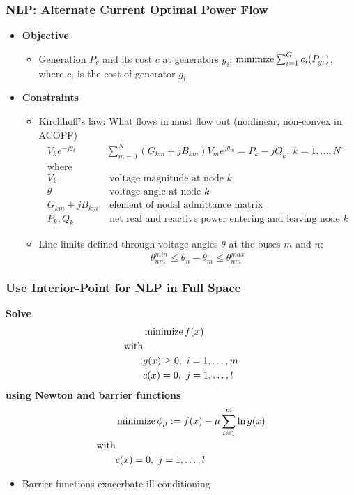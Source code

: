 \begin{frame}[fragile]
  \frametitle{NLP: Alternate Current Optimal Power Flow}
  \begin{itemize}
    \item {\bf Objective}
    \begin{itemize}
      \item Generation $P_g$ and its cost $c$ at generators $g_i$:
      $ \minimize \sum^G_{i=1} c_i(P_{g_i})$, where $c_i$ is the cost of generator $g_i$
    \end{itemize}
    \item {\bf Constraints}
    \begin{itemize}
      \item Kirchhoff's law: What flows in must flow out (nonlinear, non-convex in ACOPF)
      \begin{align*}
        V_k e^{-j\theta_k} & \sum^{N}_{m=0} (G_{km} + jB_{km})V_m e^{j\theta_m} = P_k - j Q_k,\ k = 1, \dots, N \\
        \text{where}\\
        V_k &\text{ voltage magnitude at node } k\\
        \theta &\text{ voltage angle at node } k\\
        G_{km} + jB_{km}& \text{ element of nodal admittance matrix}\\
        P_k , Q_k &\text{ net real and reactive power entering and leaving node } k
      \end{align*}
      \item Line limits defined through voltage angles $\theta$ at the buses $m$ and $n$:
      $$ \theta^{min}_{nm} \leq \theta_n - \theta_m \leq \theta^{max}_{nm}$$
    \end{itemize}
  \end{itemize}
\end{frame}

\begin{frame}[fragile]
  \frametitle{Use Interior-Point for NLP in Full Space}
  {\bf Solve}
  \begin{align*}
  &\minimize f(x)\\ 
  \text{with}&\\
  &g(x) \geq 0, \ i=1,\dots, m \\
  &c(x) = 0, \ j=1,\dots, l \\
  \end{align*}
  {\bf using Newton and barrier functions}
  \begin{align*}
  &\minimize \phi_\mu := f(x) - \mu \sum^m_{i=1} \ln g(x)\\ 
  \text{with}&\\
  &c(x) = 0, \ j=1,\dots, l 
  \end{align*}
  \begin{itemize}
    \item Barrier functions exacerbate ill-conditioning
  \end{itemize}
\end{frame}

